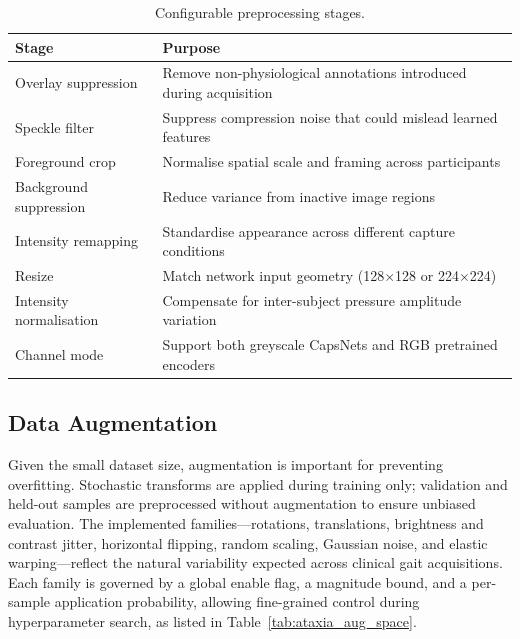 \begin{table}[htbp]
  \centering
  \caption{Configurable preprocessing stages.}
  \label{tab:ataxia_preproc_flags}
  \small
  \begin{tabularx}{\textwidth}{l X}
    \toprule
    \textbf{Stage} & \textbf{Purpose} \\
    \midrule
    Overlay suppression    & Remove non-physiological annotations introduced during acquisition \\
    Speckle filter         & Suppress compression noise that could mislead learned features \\
    Foreground crop        & Normalise spatial scale and framing across participants \\
    Background suppression & Reduce variance from inactive image regions \\
    Intensity remapping    & Standardise appearance across different capture conditions \\
    Resize                 & Match network input geometry (128$\times$128 or 224$\times$224) \\
    Intensity normalisation & Compensate for inter-subject pressure amplitude variation \\
    Channel mode           & Support both greyscale CapsNets and RGB pretrained encoders \\
    \bottomrule
  \end{tabularx}
\end{table}

\subsection{Data Augmentation}
\label{subsec:ataxia_augment}

Given the small dataset size, augmentation is important for preventing overfitting. Stochastic transforms are applied during training only; validation and held-out samples are preprocessed without augmentation to ensure unbiased evaluation. The implemented families---rotations, translations, brightness and contrast jitter, horizontal flipping, random scaling, Gaussian noise, and elastic warping---reflect the natural variability expected across clinical gait acquisitions. Each family is governed by a global enable flag, a magnitude bound, and a per-sample application probability, allowing fine-grained control during hyperparameter search, as listed in Table~\ref{tab:ataxia_aug_space}.

